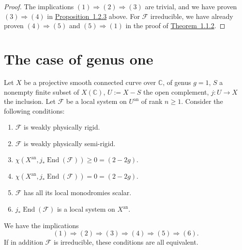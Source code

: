 \begin{proof}
The implications \((1)\Rightarrow(2)\Rightarrow(3)\) are trivial, and we have
proven \((3)\Rightarrow(4)\) in
\hyperref[prop:1.2.3]{Proposition~1.2.3} above. For \(\mathcal{F}\) irreducible,
we have already proven \((4)\Rightarrow(5)\) and \((5)\Rightarrow(1)\) in the
proof of \hyperref[thm:1.1.2]{Theorem~1.1.2}.
\end{proof}

\section{The case of genus one}
\label{sec:1.3}

\setcounter{theorem}{0}
\begin{corollary}
\label{cor:1.3.1}
Let \(X\) be a projective smooth connected curve over \(\mathbb{C}\), of genus
\(g=1\), \(S\) a nonempty finite subset of \(X(\mathbb{C})\),
\(U:=X-S\) the open complement, \(j:U\to X\) the inclusion. Let
\(\mathcal{F}\) be a local system on \(U^{\mathrm{an}}\) of rank \(n\geq 1\).
Consider the following conditions:
\leavevmode\par
\begin{enumerate}[label=(\arabic*)]
\item \(\mathcal{F}\) is weakly physically rigid.
\item \(\mathcal{F}\) is weakly physically semi-rigid.
\item \(\chi(X^{\mathrm{an}},j_*\operatorname{End}(\mathcal{F}))\geq 0=(2-2g)\).
\item \(\chi(X^{\mathrm{an}},j_*\operatorname{End}(\mathcal{F}))=0=(2-2g)\).
\item \(\mathcal{F}\) has all its local monodromies scalar.
\item \(j_*\operatorname{End}(\mathcal{F})\) is a local system on \(X^{\mathrm{an}}\).
\end{enumerate}
We have the implications
\[
  (1)\Rightarrow(2)\Rightarrow(3)\Rightarrow(4)\Rightarrow(5)\Rightarrow(6).
\]
If in addition \(\mathcal{F}\) is irreducible, these conditions are all
equivalent.
\end{corollary}

